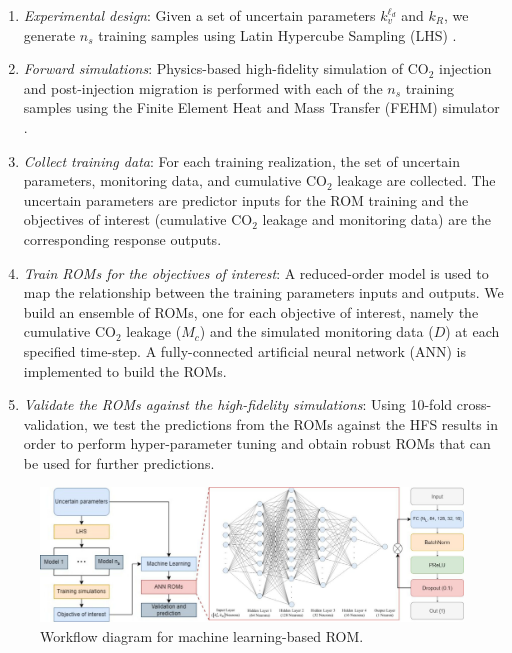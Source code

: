 \documentclass[a4paper,fleqn]{cas-sc}
\begin{document}
\begin{enumerate}[Step 1.]
\item \textit{Experimental design}: Given a set of uncertain parameters $k_{v}^{\ell_d}$ and $k_R$, we generate $n_s$ training samples using Latin Hypercube Sampling (LHS) \citep{Helton2003LatinSystems}.

\item \textit{Forward simulations}: Physics-based high-fidelity simulation of CO$_2$ injection and post-injection migration is performed with each of the $n_s$ training samples using the Finite Element Heat and Mass Transfer (FEHM) simulator \citep{Zyvoloski1997}. 

\item \textit{Collect training data}: For each training realization, the set of uncertain parameters, monitoring data, and cumulative CO$_2$ leakage are collected. The uncertain parameters are predictor inputs for the ROM training and the objectives of interest (cumulative CO$_2$ leakage and monitoring data) are the corresponding response outputs. 

\item \textit{Train ROMs for the objectives of interest}: A reduced-order model is used to map the relationship between the training parameters inputs and outputs. We build an ensemble of ROMs, one for each objective of interest, namely the cumulative CO$_2$ leakage ($M_c$) and the simulated monitoring data ($D$) at each specified time-step. A fully-connected artificial neural network (ANN) is implemented to build the ROMs. 

\item \textit{Validate the ROMs against the high-fidelity simulations}: Using 10-fold cross-validation, we test the predictions from the ROMs against the HFS results in order to perform hyper-parameter tuning and obtain robust ROMs that can be used for further predictions.
\end{enumerate}

\begin{figure}[h]
    \centering
    \includegraphics[width=16cm]{figs/Figure 1.pdf}
    \caption{Workflow diagram for machine learning-based ROM.}
    \label{mlrom}
\end{figure}
\end{document}
